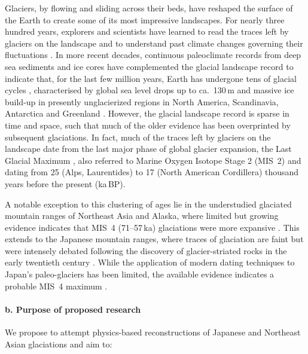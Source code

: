 \documentclass{article}
\begin{document}
    Glaciers, by flowing and sliding across their beds, have reshaped the
    surface of the Earth to create some of its most impressive landscapes. For
    nearly three hundred years, explorers and scientists have learned to read
    the traces left by glaciers on the landscape and to understand past climate
    changes governing their fluctuations \citep[e.g.,][]{Venetz.1821}.
    In more recent decades, continuous paleoclimate records from deep sea
    sediments and ice cores have complemented the glacial landscape record to
    indicate that, for the last few million years, Earth has undergone tens of
    glacial cycles \citep{Lisiecki.Raymo.2005}, characterised by global sea
    level drops up to ca.~130\,m and massive ice build-up in presently
    unglacierized regions in North America, Scandinavia, Antarctica and
    Greenland \citep{Ehlers.etal.2011}.
    However, the glacial landscape record is sparse in time and space, such
    that much of the older evidence has been overprinted by subsequent
    glaciations.  In fact, much of the traces left by glaciers on the landscape
    date from the last major phase of global glacier expansion, the Last
    Glacial Maximum \citep[LGM,][]{Heyman.etal.2011}, also referred to Marine
    Oxygen Isotope Stage 2 (MIS~2) and dating from 25 (Alps, Laurentides) to 17
    (North American Cordillera) thousand years before the present (ka\,BP).

    A notable exception to this clustering of ages lie in the understudied
    glaciated mountain ranges of Northeast Asia and Alaska, where limited but
    growing evidence indicates that MIS~4 (71--57\,ka) glaciations were more
    expansive \citep{Batchelor.etal.2019}. This extends to the Japanese
    mountain ranges, where traces of glaciation are faint but were intensely
    debated following the discovery of glacier-striated rocks in the early
    twentieth century \citep{Yamazaki.1902}. While the application of modern
    dating techniques to Japan's paleo-glaciers has been limited, the available
    evidence indicates a probable MIS~4 maximum \citep{Sawagaki.Aoki.2011}.


\paragraph{b. Purpose of proposed research}

    We propose to attempt physics-based reconstructions of Japanese and
    Northeast Asian glaciations and aim to:
\end{document}
